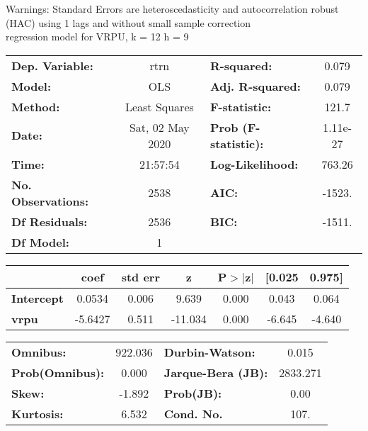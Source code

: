 Warnings: \newline
 [1] Standard Errors are heteroscedasticity and autocorrelation robust (HAC) using 1 lags and without small sample correction\\ 

regression model for VRPU, k = 12 h = 9\begin{center}
\begin{tabular}{lclc}
\toprule
\textbf{Dep. Variable:}    &       rtrn       & \textbf{  R-squared:         } &     0.079   \\
\textbf{Model:}            &       OLS        & \textbf{  Adj. R-squared:    } &     0.079   \\
\textbf{Method:}           &  Least Squares   & \textbf{  F-statistic:       } &     121.7   \\
\textbf{Date:}             & Sat, 02 May 2020 & \textbf{  Prob (F-statistic):} &  1.11e-27   \\
\textbf{Time:}             &     21:57:54     & \textbf{  Log-Likelihood:    } &    763.26   \\
\textbf{No. Observations:} &        2538      & \textbf{  AIC:               } &    -1523.   \\
\textbf{Df Residuals:}     &        2536      & \textbf{  BIC:               } &    -1511.   \\
\textbf{Df Model:}         &           1      & \textbf{                     } &             \\
\bottomrule
\end{tabular}
\begin{tabular}{lcccccc}
                   & \textbf{coef} & \textbf{std err} & \textbf{z} & \textbf{P$> |$z$|$} & \textbf{[0.025} & \textbf{0.975]}  \\
\midrule
\textbf{Intercept} &       0.0534  &        0.006     &     9.639  &         0.000        &        0.043    &        0.064     \\
\textbf{vrpu}      &      -5.6427  &        0.511     &   -11.034  &         0.000        &       -6.645    &       -4.640     \\
\bottomrule
\end{tabular}
\begin{tabular}{lclc}
\textbf{Omnibus:}       & 922.036 & \textbf{  Durbin-Watson:     } &    0.015  \\
\textbf{Prob(Omnibus):} &   0.000 & \textbf{  Jarque-Bera (JB):  } & 2833.271  \\
\textbf{Skew:}          &  -1.892 & \textbf{  Prob(JB):          } &     0.00  \\
\textbf{Kurtosis:}      &   6.532 & \textbf{  Cond. No.          } &     107.  \\
\bottomrule
\end{tabular}
\end{center}

